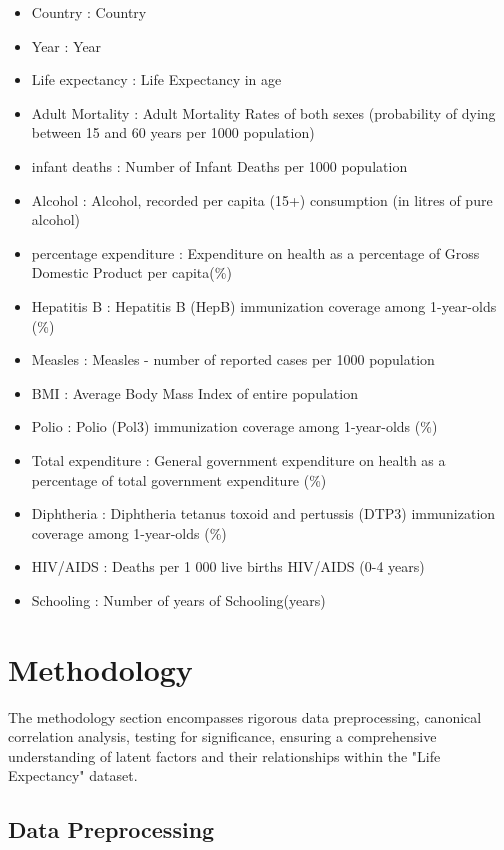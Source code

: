 \documentclass[11pt]{article}
\begin{document}
		\begin{itemize}
			\item Country : Country
			\item Year : Year
			\item Life expectancy : Life Expectancy in age		
			\item Adult Mortality : Adult Mortality Rates of both sexes (probability of dying between 15 and 60 years per 1000 population)		
			\item infant deaths : Number of Infant Deaths per 1000 population		
			\item Alcohol : Alcohol, recorded per capita (15+) consumption (in litres of pure alcohol)		
			\item percentage expenditure : Expenditure on health as a percentage of Gross Domestic Product per capita(\%)		
			\item Hepatitis B : Hepatitis B (HepB) immunization coverage among 1-year-olds (\%)		
			\item Measles : Measles - number of reported cases per 1000 population		
			\item BMI : Average Body Mass Index of entire population	
			\item Polio : Polio (Pol3) immunization coverage among 1-year-olds (\%)		
			\item Total expenditure : General government expenditure on health as a percentage of total government expenditure (\%)		
			\item Diphtheria : Diphtheria tetanus toxoid and pertussis (DTP3) immunization coverage among 1-year-olds (\%)		
			\item HIV/AIDS : Deaths per 1 000 live births HIV/AIDS (0-4 years)				
			\item Schooling : Number of years of Schooling(years)
		\end{itemize}
		
	
	\section{Methodology}
	The methodology section encompasses rigorous data preprocessing, canonical correlation analysis, testing for significance, ensuring a comprehensive understanding of latent factors and their relationships within the "Life Expectancy" dataset.
	
		\subsection{Data Preprocessing}
		
\end{document}

